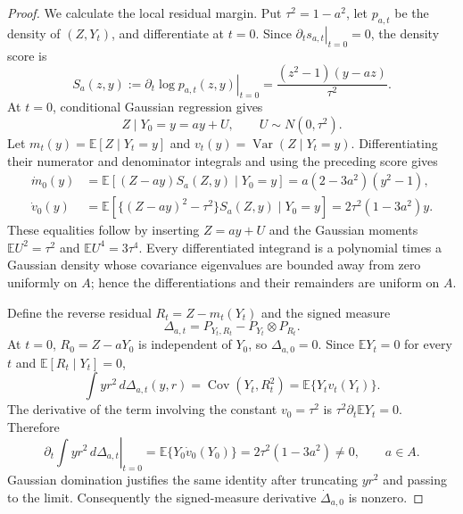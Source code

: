 \documentclass{article}
\begin{document}
\begin{proof}
We calculate the local residual margin.  Put \(\tau^2=1-a^2\), let \(p_{a,t}\) be the density of \((Z,Y_t)\), and differentiate at \(t=0\).  Since \(\left.\partial_t s_{a,t}\right|_{t=0}=0\), the density score is
\[
S_a(z,y):=\left.\partial_t\log p_{a,t}(z,y)\right|_{t=0}
=\frac{(z^2-1)(y-az)}{\tau^2}.
\]
At \(t=0\), conditional Gaussian regression gives
\[
Z\mid Y_0=y=ay+U,\qquad U\sim N(0,\tau^2).
\]
Let \(m_t(y)=\mathbb E[Z\mid Y_t=y]\) and \(v_t(y)=\operatorname{Var}(Z\mid Y_t=y)\).  Differentiating their numerator and denominator integrals and using the preceding score gives
\[
\begin{aligned}
\dot m_0(y)
&=\mathbb E[(Z-ay)S_a(Z,y)\mid Y_0=y]
=a(2-3a^2)(y^2-1),\\
\dot v_0(y)
&=\mathbb E[\{(Z-ay)^2-\tau^2\}S_a(Z,y)\mid Y_0=y]
=2\tau^2(1-3a^2)y.
\end{aligned}
\]
These equalities follow by inserting \(Z=ay+U\) and the Gaussian moments \(\mathbb E U^2=\tau^2\) and \(\mathbb E U^4=3\tau^4\).  Every differentiated integrand is a polynomial times a Gaussian density whose covariance eigenvalues are bounded away from zero uniformly on \(A\); hence the differentiations and their remainders are uniform on \(A\).

Define the reverse residual \(R_t=Z-m_t(Y_t)\) and the signed measure
\[
\Delta_{a,t}=P_{Y_t,R_t}-P_{Y_t}\otimes P_{R_t}.
\]
At \(t=0\), \(R_0=Z-aY_0\) is independent of \(Y_0\), so \(\Delta_{a,0}=0\).  Since \(\mathbb E Y_t=0\) for every \(t\) and \(\mathbb E[R_t\mid Y_t]=0\),
\[
\int yr^2\,d\Delta_{a,t}(y,r)=\operatorname{Cov}(Y_t,R_t^2)=\mathbb E\{Y_tv_t(Y_t)\}.
\]
The derivative of the term involving the constant \(v_0=\tau^2\) is \(\tau^2\partial_t\mathbb E Y_t=0\).  Therefore
\[
\left.\partial_t\int yr^2\,d\Delta_{a,t}\right|_{t=0}
=\mathbb E\{Y_0\dot v_0(Y_0)\}
=2\tau^2(1-3a^2)\ne0,\qquad a\in A.
\]
Gaussian domination justifies the same identity after truncating \(yr^2\) and passing to the limit.  Consequently the signed-measure derivative \(\dot\Delta_{a,0}\) is nonzero.


\end{proof}
\end{document}
